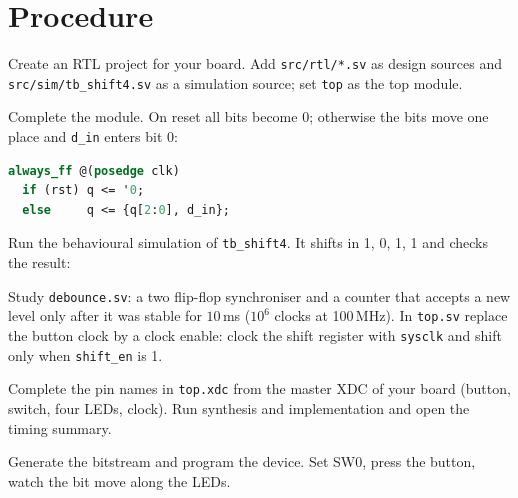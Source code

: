 \section{Procedure}

Create an RTL project for your board. Add \texttt{src/rtl/*.sv} as design sources and
\texttt{src/sim/tb\_shift4.sv} as a simulation source; set \texttt{top} as the top module.

Complete the module. On reset all bits become 0; otherwise the bits move one place and \texttt{d\_in}
enters bit 0:
\begin{lstlisting}[language=SystemVerilog]
always_ff @(posedge clk)
  if (rst) q <= '0;
  else     q <= {q[2:0], d_in};
\end{lstlisting}

Run the behavioural simulation of \texttt{tb\_shift4}. It shifts in 1, 0, 1, 1 and checks the result:

Study \texttt{debounce.sv}: a two flip-flop synchroniser and a counter that accepts a new level only
after it was stable for $10$\,ms ($10^6$ clocks at 100\,MHz). In \texttt{top.sv} replace the button
clock by a clock enable: clock the shift register with \texttt{sysclk} and shift only when
\texttt{shift\_en} is 1.

Complete the pin names in \texttt{top.xdc} from the master XDC of your board (button, switch, four LEDs,
clock). Run synthesis and implementation and open the timing summary.

Generate the bitstream and program the device. Set SW0, press the button, watch the bit move along the
LEDs.
